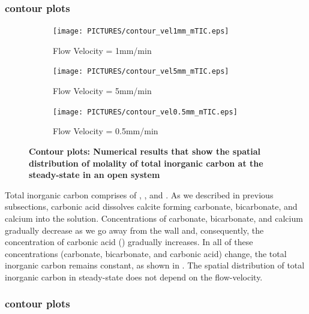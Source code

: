 \subsubsection*{ contour plots} \label{sssec:contourmTIC}
\begin{figure}[!h]
\centering
    \begin{subfigure}{.5\linewidth}
        \centering
        \texttt{[image: PICTURES/contour\_vel1mm\_mTIC.eps]}
        \caption{\small Flow Velocity = 1mm/min}
        \label{fig:TICSteady-state}       %
    \end{subfigure}%
    \hfill
    \begin{subfigure}{.5\linewidth}
        \centering
        \texttt{[image: PICTURES/contour\_vel5mm\_mTIC.eps]}
        \caption{\small Flow Velocity = 5mm/min}
        \label{fig:TICSteady-state5mm}       %
    \end{subfigure}%
    \hfill
    \begin{subfigure}{.5\linewidth}
        \centering
        \texttt{[image: PICTURES/contour\_vel0.5mm\_mTIC.eps]}
        \caption{\small Flow Velocity = 0.5mm/min}
        \label{fig:TICSteady-state0.5mm}       %
    \end{subfigure}%
    \caption [\DuMuX Contour plots: Numerical results that show the spatial distribution of molality of total 
    inorganic carbon at the steady-state in an open system] {\textbf{\DuMuX Contour plots: Numerical results that show the spatial distribution of molality of total 
    inorganic carbon at the steady-state in an open system}}
     \label{fig:contourTIC}
\end{figure}

Total inorganic carbon comprises of , ,  and . As we described in previous subsections, 
carbonic acid dissolves calcite forming carbonate, bicarbonate, and calcium into the solution. Concentrations of carbonate, bicarbonate, and calcium 
gradually decrease as we go away from the wall and, consequently, the concentration of carbonic acid () gradually increases. 
In all of these concentrations (carbonate, bicarbonate, and carbonic acid) change, the total inorganic carbon remains constant, as shown in .
The spatial distribution of total inorganic carbon in steady-state does not depend on the flow-velocity. 

\subsubsection*{ contour plots} \label{sssec:contourmCa}

